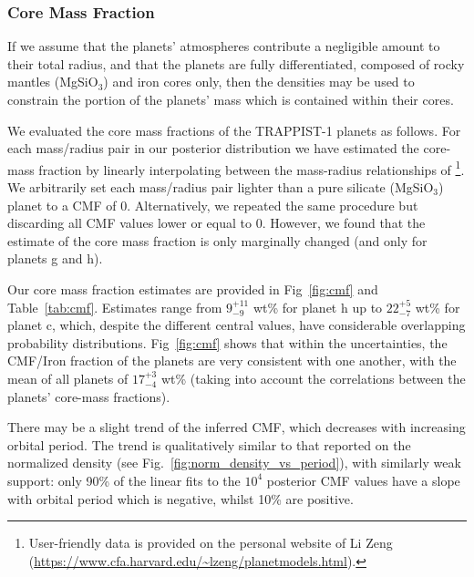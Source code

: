 \documentclass[fleqn,usenatbib]{mnras} %
\begin{document}
\subsubsection{Core Mass Fraction}
\label{sec:subsection_CMF}

If we assume that the planets' atmospheres contribute a negligible
amount to their total radius, and that the planets are fully differentiated, composed of rocky mantles (MgSiO$_3$) and iron cores only, then the densities may be used to constrain the portion of the planets' mass which is contained within their cores.

We evaluated the core mass fractions of the TRAPPIST-1 planets as follows. For each mass/radius pair in our posterior distribution we have estimated the core-mass fraction by linearly interpolating between the mass-radius relationships of \citet{Zeng2016}\footnote{User-friendly data is provided on the personal website of Li Zeng (\url{https://www.cfa.harvard.edu/~lzeng/planetmodels.html}).}. We arbitrarily set each mass/radius pair lighter than a pure silicate (MgSiO$_3$) planet to a CMF of 0. Alternatively, we repeated the same procedure but discarding all CMF values lower or equal to 0. However, we found that the estimate of the core mass fraction is only marginally changed (and only for planets g and h).

Our core mass fraction estimates are provided in Fig~\ref{fig:cmf} and Table~\ref{tab:cmf}.  Estimates range from $9_{-9}^{+11}$ wt\% for planet h up to $22_{-7}^{+5}$ wt\% for planet c, which,  despite the different central values, have considerable overlapping probability distributions.
Fig~\ref{fig:cmf} shows that within the uncertainties, the CMF/Iron fraction of the planets are very consistent with one another, with the mean of all planets of $17_{-4}^{+3}$ wt\% (taking into account the correlations between the planets' core-mass fractions).

There may be a slight trend of the inferred CMF, which decreases with increasing orbital period. The trend is qualitatively similar to that reported on the normalized density (see Fig.~\ref{fig:norm_density_vs_period}), with similarly weak support: only 90\% of the linear fits to the $10^4$ posterior CMF values have a slope with orbital period which is negative, whilst 10\% are positive.
\end{document}
